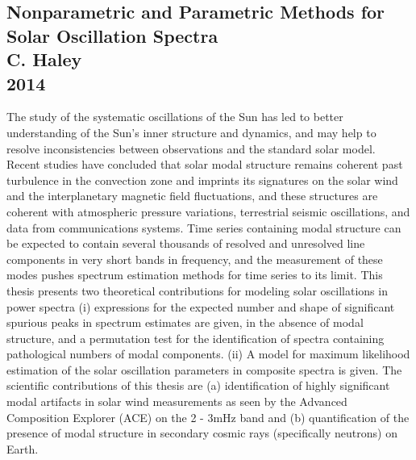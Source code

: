 \documentclass{article}
\begin{document}
\subsection{Nonparametric and Parametric Methods for Solar Oscillation Spectra \\
C. Haley \\
2014}
The study of the systematic oscillations of the Sun has led to better understanding of the Sun’s inner structure and dynamics, and may help to resolve inconsistencies between observations and the standard solar model. Recent studies have concluded that solar modal structure remains coherent past turbulence in the convection zone and imprints its signatures on the solar wind and the interplanetary magnetic field fluctuations, and these structures are coherent with atmospheric pressure variations, terrestrial seismic oscillations, and data from communications systems. Time series containing modal structure can be expected to contain several thousands of resolved and unresolved line components in very short bands in frequency, and the measurement of these modes pushes spectrum estimation methods for time series to its limit. This thesis presents two theoretical contributions for modeling solar oscillations in power spectra (i) expressions for the expected number and shape of significant spurious peaks in spectrum estimates are given, in the absence of modal structure, and a permutation test for the identification of spectra containing pathological numbers of modal components. (ii) A model for maximum likelihood estimation of the solar oscillation parameters in composite spectra is given. The scientific contributions of this thesis are (a) identification of highly significant modal artifacts in solar wind measurements as seen by the Advanced Composition Explorer (ACE) on the 2 - 3mHz band and (b) quantification of the presence of modal structure in secondary cosmic rays (specifically neutrons) on Earth.\\

\\
\end{document}
